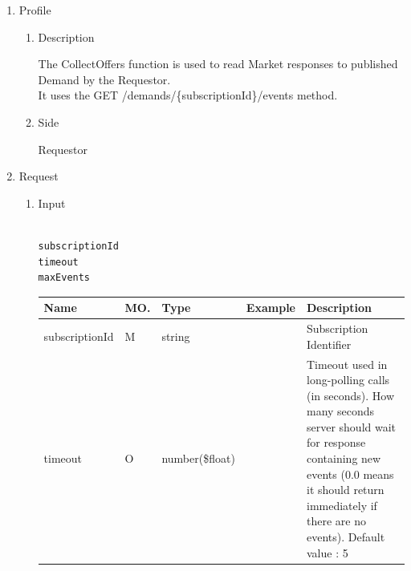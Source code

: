 \begin{enumerate}

\item Profile

\begin{enumerate}

\item Description

The CollectOffers function is used to read Market responses to published Demand by the Requestor.  \\
It uses the GET /demands/\{subscriptionId\}/events method.

\item Side

Requestor

\end{enumerate}

\item Request

\begin{enumerate}

\item Input

\begin{tcolorbox}[boxrule=0pt, frame empty]
\begin{verbatim}

subscriptionId
timeout
maxEvents

\end{verbatim}
\end{tcolorbox}


\begin{table}[H]
\footnotesize

\begin{center}
\begin{tabular}{|p{3cm}|l|p{3cm}|p{3cm}|p{4cm}|} 
\hline
\rowcolor{lightgray}	Name	& MO.	& Type	& Example & 	Description \\
\hline

subscriptionId	& M	& 	string			&		&	Subscription Identifier \\ 

\hline

timeout			& O	& 	number(\$float)	&		&	Timeout used in long-polling calls (in seconds). 
													How many seconds server should wait for response containing new events 
													(0.0 means it should return immediately if there are no events).	Default value : 5 \\ 


\end{tabular}
\end{center}
\end{table}
\end{enumerate}
\end{enumerate}
